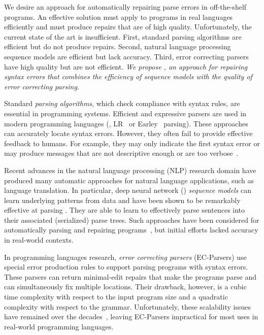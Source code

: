 We desire an approach for automatically repairing parse errors in off-the-shelf
programs. An effective solution must apply to programs in real languages
efficiently and must produce repairs that are of high quality. Unfortunately,
the current state of the art is insufficient. First, standard parsing algorithms
are efficient but do not produce repairs. Second, natural language processing
sequence models are efficient but lack accuracy. Third, error correcting parsers
have high quality but are not efficient. \emph{We propose \toolname, an approach
for repairing syntax errors that combines the efficiency of sequence models with
the quality of error correcting parsing.}

Standard \emph{parsing algorithms}, which check compliance with syntax rules,
are essential in programming systems. Efficient and expressive parsers are used
in modern programming languages (\eg, LR~\citep{Aho1974} or
Earley~\citep{Earley_1970} parsing). These approaches can accurately locate
syntax errors. However, they often fail to provide effective feedback to humans.
For example, they may only indicate the first syntax error or may produce
messages that are not descriptive enough or are too
verbose~\citep{Kummerfeld2003, Ahadi_2018, VanDerSpek_2005}.
%

Recent advances in the natural language processing (NLP) research domain
\citep{Sutskever_2014, Hardalov_2018} have produced many automatic approaches
for natural language applications, such as language translation. In particular,
deep neural network (\dnn) \emph{sequence models} can learn underlying patterns
from data and have been shown to be remarkably effective at parsing
\citep{Vinyals2015}. They are able to learn to effectively parse sentences into
their associated (serialized) parse trees. Such approaches have been considered
for automatically parsing and repairing programs~\citep{Ahmed_2021}, but initial
efforts lacked accuracy in real-world contexts.

In programming languages research, \emph{error
correcting parsers} (EC-Parsers) \citep{Aho_1972} use special error production
rules to support parsing programs with syntax errors. These parsers can return
minimal-edit repairs that make the programs parse and can simultaneously fix
multiple locations. Their drawback,
however, is a cubic time complexity with respect to the
input program size and a quadratic complexity with respect to the grammar.
%
Unfortunately, these scalability issues have remained over the
decades~\citep{McLean1996, Rajasekaran2014}, leaving EC-Parsers
impractical for most uses in real-world programming languages.

